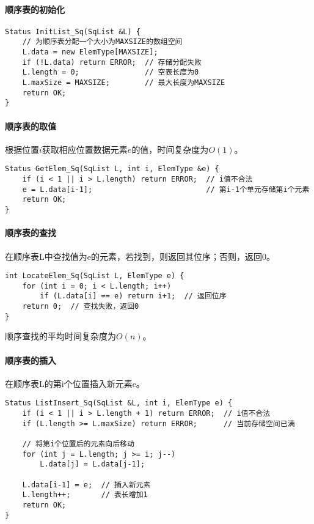 \documentclass{../../note}
\begin{document}
\paragraph{顺序表的初始化}
\begin{verbatim}
Status InitList_Sq(SqList &L) {
    // 为顺序表分配一个大小为MAXSIZE的数组空间
    L.data = new ElemType[MAXSIZE];
    if (!L.data) return ERROR;  // 存储分配失败
    L.length = 0;               // 空表长度为0
    L.maxSize = MAXSIZE;        // 最大长度为MAXSIZE
    return OK;
}
\end{verbatim}

\paragraph{顺序表的取值}
根据位置$i$获取相应位置数据元素$e$的值，时间复杂度为$O(1)$。

\begin{verbatim}
Status GetElem_Sq(SqList L, int i, ElemType &e) {
    if (i < 1 || i > L.length) return ERROR;  // i值不合法
    e = L.data[i-1];                          // 第i-1个单元存储第i个元素
    return OK;
}
\end{verbatim}

\paragraph{顺序表的查找}
在顺序表L中查找值为e的元素，若找到，则返回其位序；否则，返回0。

\begin{verbatim}
int LocateElem_Sq(SqList L, ElemType e) {
    for (int i = 0; i < L.length; i++)
        if (L.data[i] == e) return i+1;  // 返回位序
    return 0;  // 查找失败，返回0
}
\end{verbatim}

顺序查找的平均时间复杂度为$O(n)$。

\paragraph{顺序表的插入}
在顺序表L的第i个位置插入新元素e。

\begin{verbatim}
Status ListInsert_Sq(SqList &L, int i, ElemType e) {
    if (i < 1 || i > L.length + 1) return ERROR;  // i值不合法
    if (L.length >= L.maxSize) return ERROR;      // 当前存储空间已满

    // 将第i个位置后的元素向后移动
    for (int j = L.length; j >= i; j--)
        L.data[j] = L.data[j-1];

    L.data[i-1] = e;  // 插入新元素
    L.length++;       // 表长增加1
    return OK;
}
\end{verbatim}
\end{document}
